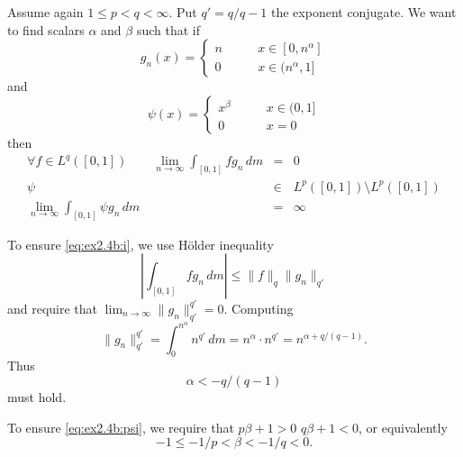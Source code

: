 \begin{enumerate}
\begin{itemize}
  Assume again \(1\leq p < q < \infty\). 
  Put \(q' = q/q-1\) the exponent conjugate.
  We want to find scalars \(\alpha\) and \(\beta\) such that if
  \begin{equation*}
    g_n(x) = \left\{\begin{array}{ll}
                     n & \qquad x \in [0,n^\alpha] \\
                     0 & \qquad x \in (n^\alpha, 1]
                    \end{array}\right.
  \end{equation*}
  and 
  \begin{equation*}
    \psi(x) = \left\{\begin{array}{ll}
                      x^\beta & \qquad x\in (0,1] \\
                      0       & \qquad x = 0
                    \end{array}\right.
  \end{equation*}
  then
  \begin{eqnarray}
   \forall f\in L^q([0,1])\qquad 
   \lim_{n\to \infty} \int_{[0,1]} fg_n\,dm &=& 0
                         \label{eq:ex2.4b:i} \\
   \psi &\in&  L^p([0,1]) \setminus L^p([0,1])
                         \label{eq:ex2.4b:psi} \\
   \lim_{n\to \infty} \int_{[0,1]} \psi g_n\,dm &=& \infty
                         \label{eq:ex2.4b:iii}
  \end{eqnarray}

  To ensure \eqref{eq:ex2.4b:i}, we use H\"older inequality
  \begin{equation*}
  \left|\int_{[0,1]} fg_n\,dm \right| \leq \|f\|_q \|g_n\|_{q'}
  \end{equation*}
  and require that
  \(\lim_{n\to\infty} \|g_n\|_{q'}^{q'} = 0.\)
  Computing
  \begin{equation*}
   \|g_n\|_{q'}^{q'} = \int_0^{n^\alpha} n^{q'}\,dm 
   = n^\alpha \cdot n^{q'} = n^{\alpha + q/(q-1)}.
  \end{equation*}
  Thus 
  \begin{equation} \label{eq:ex2.4b:alpha}
  \alpha < -q/(q-1)
  \end{equation}
  must hold.

  To ensure \eqref{eq:ex2.4b:psi}, we require that 
  \(p\beta + 1 > 0\)
  \(q\beta + 1 < 0\), or equivalently
  \begin{equation} \label{eq:ex2.4b:beta1}
   -1 \leq -1/p < \beta < -1/q < 0.
  \end{equation}


\end{itemize}
\end{enumerate}

